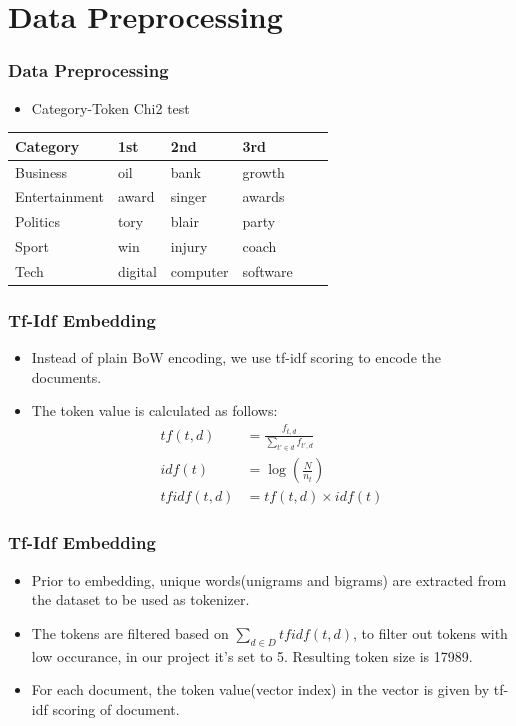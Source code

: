 \documentclass[
    10pt %
    16:9, %
]{beamer}
\begin{document}
\section{Data Preprocessing}
\frame
{
  \frametitle{Data Preprocessing}
  \begin{itemize}
    \item Category-Token Chi2 test
  \end{itemize}
  \begin{table}
    \centering
    \begin{tabular}{@{}llllll@{}}
        \toprule
        Category       & 1st       & 2nd      & 3rd      \\ \midrule
        Business       & oil       & bank     & growth   \\
        Entertainment  & award     & singer   & awards   \\
        Politics       & tory      & blair    & party    \\
        Sport          & win       & injury   & coach    \\
        Tech           & digital   & computer & software \\
        \bottomrule
    \end{tabular}
  \end{table}
}

\begin{frame}
  \frametitle{Tf-Idf Embedding}
  \begin{itemize}
    \item Instead of plain BoW encoding, we use tf-idf scoring to encode the documents.
    \item The token value is calculated as follows:
    \begin{align}
      tf(t,d) &= \frac{f_{t,d}}{\sum_{t' \in d} f_{t',d}} \\
      idf(t) &= \log\left(\frac{N}{n_t}\right) \\
      tfidf(t,d) &= tf(t,d) \times idf(t)
    \end{align}
  \end{itemize}
\end{frame}

\begin{frame}
  \frametitle{Tf-Idf Embedding}
  \begin{itemize}
    \item Prior to embedding, unique words(unigrams and bigrams) are extracted from the dataset to be used as tokenizer.
    \item The tokens are filtered based on $\sum_{d \in D} tfidf(t,d)$, to filter out tokens with low occurance, in our project it's set to 5. Resulting token size is 17989.
    \item For each document, the token value(vector index) in the vector is given by tf-idf scoring of document.
  \end{itemize}
\end{frame}
\end{document}
